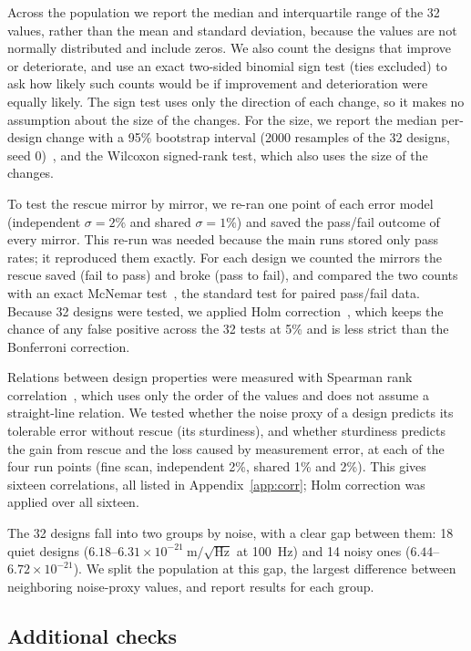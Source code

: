 Across the population we report the median and interquartile range of the 32 values, rather than the mean and standard deviation, because the values are not normally distributed and include zeros. We also count the designs that improve or deteriorate, and use an exact two-sided binomial sign test (ties excluded) to ask how likely such counts would be if improvement and deterioration were equally likely. The sign test uses only the direction of each change, so it makes no assumption about the size of the changes. For the size, we report the median per-design change with a 95\% bootstrap interval (2000 resamples of the 32 designs, seed 0)~\cite{Efron1993}, and the Wilcoxon signed-rank test, which also uses the size of the changes.

To test the rescue mirror by mirror, we re-ran one point of each error model (independent $\sigma = 2\%$ and shared $\sigma = 1\%$) and saved the pass/fail outcome of every mirror. This re-run was needed because the main runs stored only pass rates; it reproduced them exactly. For each design we counted the mirrors the rescue saved (fail to pass) and broke (pass to fail), and compared the two counts with an exact McNemar test~\cite{McNemar1947}, the standard test for paired pass/fail data. Because 32 designs were tested, we applied Holm correction~\cite{Holm1979}, which keeps the chance of any false positive across the 32 tests at 5\% and is less strict than the Bonferroni correction.

Relations between design properties were measured with Spearman rank correlation~\cite{Spearman1904}, which uses only the order of the values and does not assume a straight-line relation. We tested whether the noise proxy of a design predicts its tolerable error without rescue (its sturdiness), and whether sturdiness predicts the gain from rescue and the loss caused by measurement error, at each of the four run points (fine scan, independent 2\%, shared 1\% and 2\%). This gives sixteen correlations, all listed in Appendix~\ref{app:corr}; Holm correction was applied over all sixteen.

The 32 designs fall into two groups by noise, with a clear gap between them: 18 quiet designs ($6.18$--$6.31\times10^{-21}~\mathrm{m}/\sqrt{\mathrm{Hz}}$ at 100~Hz) and 14 noisy ones ($6.44$--$6.72\times10^{-21}$). We split the population at this gap, the largest difference between neighboring noise-proxy values, and report results for each group.

\subsection{Additional checks}
\label{sec:checks}

